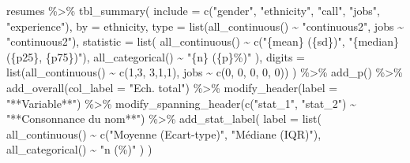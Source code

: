 \documentclass[
  11pt,
]{book}
\newenvironment{Shaded}{\begin{snugshade}}{\end{snugshade}}
\newcommand{\AttributeTok}[1]{\textcolor[rgb]{0.77,0.63,0.00}{#1}}
\newcommand{\DecValTok}[1]{\textcolor[rgb]{0.00,0.00,0.81}{#1}}
\newcommand{\FunctionTok}[1]{\textcolor[rgb]{0.00,0.00,0.00}{#1}}
\newcommand{\NormalTok}[1]{#1}
\newcommand{\SpecialCharTok}[1]{\textcolor[rgb]{0.00,0.00,0.00}{#1}}
\newcommand{\StringTok}[1]{\textcolor[rgb]{0.31,0.60,0.02}{#1}}
\numberwithin{equation}{section}
\numberwithin{countremarque}{section}
\begin{document}
\begin{Shaded}
\begin{Highlighting}[]
\NormalTok{resumes }\SpecialCharTok{\%\textgreater{}\%}
  \FunctionTok{tbl\_summary}\NormalTok{(}
    \AttributeTok{include =} \FunctionTok{c}\NormalTok{(}\StringTok{"gender"}\NormalTok{, }\StringTok{"ethnicity"}\NormalTok{, }\StringTok{"call"}\NormalTok{, }\StringTok{"jobs"}\NormalTok{, }\StringTok{"experience"}\NormalTok{),}
    \AttributeTok{by =}\NormalTok{ ethnicity,}
    \AttributeTok{type =} \FunctionTok{list}\NormalTok{(}\FunctionTok{all\_continuous}\NormalTok{() }\SpecialCharTok{\textasciitilde{}} \StringTok{"continuous2"}\NormalTok{,}
\NormalTok{                jobs }\SpecialCharTok{\textasciitilde{}} \StringTok{"continuous2"}\NormalTok{),}
    \AttributeTok{statistic =} \FunctionTok{list}\NormalTok{(}
      \FunctionTok{all\_continuous}\NormalTok{() }\SpecialCharTok{\textasciitilde{}} \FunctionTok{c}\NormalTok{(}\StringTok{"\{mean\} (\{sd\})"}\NormalTok{, }\StringTok{"\{median\} (\{p25\}, \{p75\})"}\NormalTok{),}
      \FunctionTok{all\_categorical}\NormalTok{() }\SpecialCharTok{\textasciitilde{}} \StringTok{"\{n\} (\{p\}\%)"}
\NormalTok{      ),}
    \AttributeTok{digits =} \FunctionTok{list}\NormalTok{(}\FunctionTok{all\_continuous}\NormalTok{() }\SpecialCharTok{\textasciitilde{}} \FunctionTok{c}\NormalTok{(}\DecValTok{1}\NormalTok{,}\DecValTok{3}\NormalTok{, }\DecValTok{3}\NormalTok{,}\DecValTok{1}\NormalTok{,}\DecValTok{1}\NormalTok{),}
\NormalTok{                  jobs }\SpecialCharTok{\textasciitilde{}} \FunctionTok{c}\NormalTok{(}\DecValTok{0}\NormalTok{, }\DecValTok{0}\NormalTok{, }\DecValTok{0}\NormalTok{, }\DecValTok{0}\NormalTok{, }\DecValTok{0}\NormalTok{))}
\NormalTok{    ) }\SpecialCharTok{\%\textgreater{}\%} 
  \FunctionTok{add\_p}\NormalTok{() }\SpecialCharTok{\%\textgreater{}\%} 
  \FunctionTok{add\_overall}\NormalTok{(}\AttributeTok{col\_label =} \StringTok{"Ech. total"}\NormalTok{) }\SpecialCharTok{\%\textgreater{}\%} 
  \FunctionTok{modify\_header}\NormalTok{(}\AttributeTok{label =} \StringTok{"**Variable**"}\NormalTok{) }\SpecialCharTok{\%\textgreater{}\%} 
  \FunctionTok{modify\_spanning\_header}\NormalTok{(}\FunctionTok{c}\NormalTok{(}\StringTok{"stat\_1"}\NormalTok{, }\StringTok{"stat\_2"}\NormalTok{) }\SpecialCharTok{\textasciitilde{}} \StringTok{"**Consonnance du nom**"}\NormalTok{) }\SpecialCharTok{\%\textgreater{}\%} 
  \FunctionTok{add\_stat\_label}\NormalTok{(}
    \AttributeTok{label =} \FunctionTok{list}\NormalTok{(}
      \FunctionTok{all\_continuous}\NormalTok{() }\SpecialCharTok{\textasciitilde{}} \FunctionTok{c}\NormalTok{(}\StringTok{"Moyenne (Ecart{-}type)"}\NormalTok{, }\StringTok{"Médiane (IQR)"}\NormalTok{),}
      \FunctionTok{all\_categorical}\NormalTok{() }\SpecialCharTok{\textasciitilde{}} \StringTok{"n (\%)"}
\NormalTok{    )}
\NormalTok{  )}
\end{Highlighting}
\end{Shaded}
\end{document}

